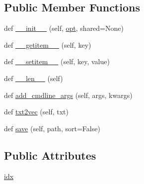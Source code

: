 \subsection*{Public Member Functions}
\begin{DoxyCompactItemize}
\item 
def \hyperlink{classparlai_1_1agents_1_1test__agents_1_1dummy__torch__agent_1_1MockDict_ac1430e2d948a25733e5302222479a351}{\+\_\+\+\_\+init\+\_\+\+\_\+} (self, \hyperlink{classparlai_1_1core_1_1agents_1_1Agent_ab3b45d2754244608c75d4068b90cd051}{opt}, shared=None)
\item 
def \hyperlink{classparlai_1_1agents_1_1test__agents_1_1dummy__torch__agent_1_1MockDict_a12fd29d05619f6363ced34701e41f00f}{\+\_\+\+\_\+getitem\+\_\+\+\_\+} (self, key)
\item 
def \hyperlink{classparlai_1_1agents_1_1test__agents_1_1dummy__torch__agent_1_1MockDict_a57145a69f7da7d11a5eab5ab40c56817}{\+\_\+\+\_\+setitem\+\_\+\+\_\+} (self, key, value)
\item 
def \hyperlink{classparlai_1_1agents_1_1test__agents_1_1dummy__torch__agent_1_1MockDict_ae129f36493047793b249c2c4c2432df2}{\+\_\+\+\_\+len\+\_\+\+\_\+} (self)
\item 
def \hyperlink{classparlai_1_1agents_1_1test__agents_1_1dummy__torch__agent_1_1MockDict_a0c2645a84df36676d1a8dd887b05fa1f}{add\+\_\+cmdline\+\_\+args} (self, args, kwargs)
\item 
def \hyperlink{classparlai_1_1agents_1_1test__agents_1_1dummy__torch__agent_1_1MockDict_a390123aa7a8a16f5971a7dfbe261d353}{txt2vec} (self, txt)
\item 
def \hyperlink{classparlai_1_1agents_1_1test__agents_1_1dummy__torch__agent_1_1MockDict_a999f231b74f567c2a897eaac2e354a9b}{save} (self, path, sort=False)
\end{DoxyCompactItemize}
\subsection*{Public Attributes}
\begin{DoxyCompactItemize}
\item 
\hyperlink{classparlai_1_1agents_1_1test__agents_1_1dummy__torch__agent_1_1MockDict_a057102cbf8be42d035012b1b46fadebe}{idx}
\end{DoxyCompactItemize}
